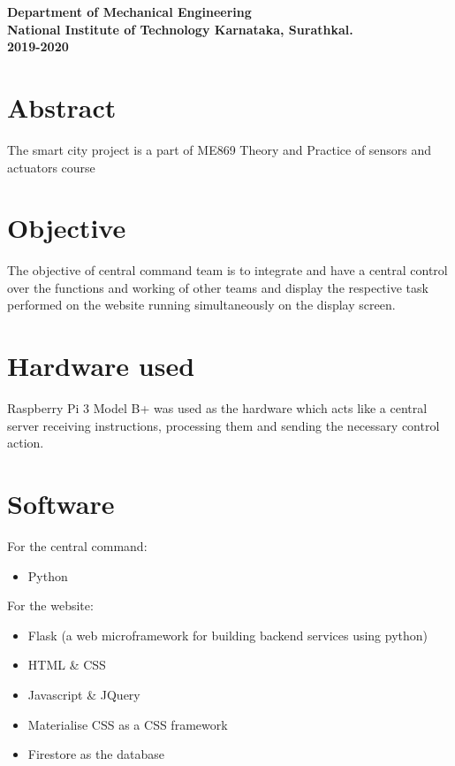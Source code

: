 \documentclass{article}[12pt,a4paper]
\begin{document}
\begin{titlepage}
\begin{figure}[!ht]
    \end{figure}
    \vspace{2em}
    {\Large \bfseries Department of Mechanical Engineering}\\
    \vspace{0.5em}
    {\Large \bfseries National Institute of Technology Karnataka, Surathkal.}\\
    \vspace{0.5em}
    {\Large \bfseries 2019-2020}
\end{titlepage}

\section*{Abstract}

The smart city project is a part of ME869 Theory and Practice of sensors and actuators course


\newpage
\tableofcontents
\thispagestyle{empty}
\newpage
{}

\section{Objective}

The objective of central command team is to integrate and have a central control over the functions and working of other teams and display the respective task performed on the website running simultaneously on the display screen.

\section{Hardware used}
Raspberry Pi 3 Model B+ was used as the hardware which acts like a central server receiving instructions, processing them and sending the necessary control action.

\section{Software}
For the central command:
\begin{itemize}
	\item Python
\end{itemize}
For the website:
\begin{itemize}
	\item Flask (a web microframework for building backend services using python)
	\item HTML \& CSS
	\item Javascript \& JQuery
	\item Materialise CSS as a CSS framework
	\item Firestore as the database
\end{itemize}
\end{document}
